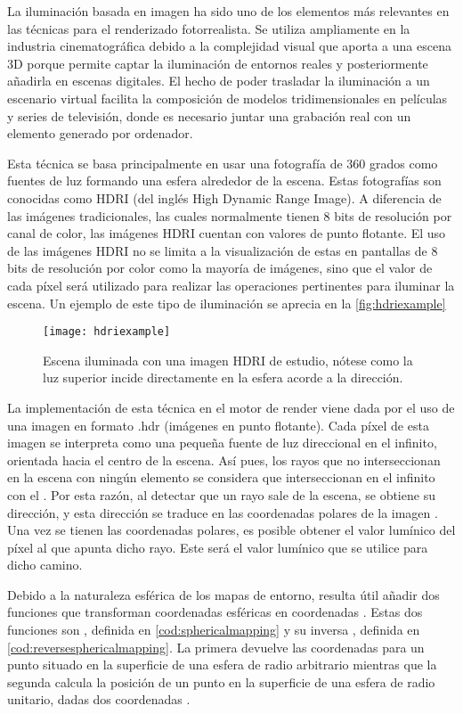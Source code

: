 La iluminación basada en imagen ha sido uno de los elementos más relevantes en las técnicas para el renderizado fotorrealista. Se utiliza ampliamente en la industria cinematográfica debido a la complejidad visual que aporta a una escena 3D porque permite captar la iluminación de entornos reales y posteriormente añadirla en escenas digitales. El hecho de poder trasladar la iluminación a un escenario virtual facilita la composición de modelos tridimensionales en películas y series de televisión, donde es necesario juntar una grabación real con un elemento generado por ordenador.

Esta técnica se basa principalmente en usar una fotografía de 360 grados como fuentes de luz formando una esfera alrededor de la escena. Estas fotografías son conocidas como HDRI (del inglés High Dynamic Range Image). A diferencia de las imágenes tradicionales, las cuales normalmente tienen 8 bits de resolución por canal de color, las imágenes HDRI cuentan con valores de punto flotante. El uso de las imágenes HDRI no se limita a la visualización de estas en pantallas de 8 bits de resolución por color como la mayoría de imágenes, sino que el valor de cada píxel será utilizado para realizar las operaciones pertinentes para iluminar la escena. Un ejemplo de este tipo de iluminación se aprecia en la \autoref{fig:hdriexample}

		
\begin{figure}[H]
	\label{fig:hdriexample}
    \centering
	\texttt{[image: hdriexample]}
	\caption{Escena iluminada con una imagen HDRI de estudio, nótese como la luz superior incide directamente en la esfera acorde a la dirección.}
\end{figure}

La implementación de esta técnica en el motor de render viene dada por el uso de una imagen en formato .hdr (imágenes en punto flotante). Cada píxel de esta imagen se interpreta como una pequeña fuente de luz direccional en el infinito, orientada hacia el centro de la escena. Así pues, los rayos que no interseccionan en la escena con ningún elemento se considera que interseccionan en el infinito con el . Por esta razón, al detectar que un rayo sale de la escena, se obtiene su dirección, y esta dirección se traduce en las coordenadas polares de la imagen . Una vez se tienen las coordenadas polares, es posible obtener el valor lumínico del píxel al que apunta dicho rayo. Este será el valor lumínico que se utilice para dicho camino.
	

Debido a la naturaleza esférica de los mapas de entorno, resulta útil añadir dos funciones que transforman coordenadas esféricas en coordenadas . Estas dos funciones son , definida en \autoref{cod:sphericalmapping} y su inversa , definida en \autoref{cod:reversesphericalmapping}. La primera devuelve las coordenadas  para un punto situado en la superficie de una esfera de radio arbitrario mientras que la segunda calcula la posición de un punto en la superficie de una esfera de radio unitario, dadas dos coordenadas .


